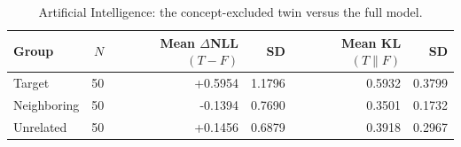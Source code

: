 \begin{table}[t]
\centering
\small
\begin{tabular}{lrrrrr}
\toprule
Group & $N$ & Mean $\Delta$NLL$(T{-}F)$ & SD & Mean KL$(T\|F)$ & SD \\
\midrule
Target & 50 & +0.5954 & 1.1796 & 0.5932 & 0.3799 \\
Neighboring & 50 & -0.1394 & 0.7690 & 0.3501 & 0.1732 \\
Unrelated & 50 & +0.1456 & 0.6879 & 0.3918 & 0.2967 \\
\bottomrule
\end{tabular}
\caption{Artificial Intelligence: the concept-excluded twin versus the full model.}
\label{tab:ai-twin-vs-full}
\end{table}

